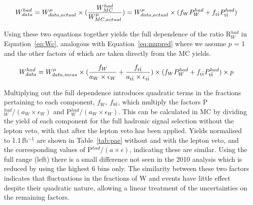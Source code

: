 \begin{equation}
W^{had}_{data} = W^{\mu}_{data, actual } \times (\frac{W^{had}_{MC}}{W^{\mu}_{MC, actual}}) = W^{\mu}_{data, actual } \times (f_{W} P^{had}_{W} + f_{\textrm{t}\bar{\textrm{t}}} P^{had}_{\textrm{t}\bar{\textrm{t}}})
\label{eq:Wb}
\end{equation}

Using these two equations together yields the full dependence of the ratio R$^{had}_{W}$ in Equation~\ref{eq:Wc}, analogous with Equation~\ref{eq:mupred} where we assume $p$ = 1 and the other factors of which are taken directly from the MC yields.

\begin{equation}
W^{had}_{data} = W^{\mu}_{data, meas} \times (\frac{f_{W}}{a_{W} \times \epsilon_{W}} + \frac{f_{\textrm{t}\bar{\textrm{t}}}}{a_{\textrm{t}\bar{\textrm{t}}} \times \epsilon_{\textrm{t}\bar{\textrm{t}}}}) \times (f_{W} P^{had}_{W} + f_{\textrm{t}\bar{\textrm{t}}} P^{had}_{\textrm{t}\bar{\textrm{t}}}) \times p
\label{eq:Wc}
\end{equation}

 Multiplying out the full dependence introduces quadratic terms in the fractions pertaining to each component, $f_{W}$, $f_{\textrm{t}\bar{\textrm{t}}}$, which multiply the factors P$^{had}_{W}/(a_{W} \times \epsilon_{W})$ and P$^{had}_{W}/(a_{W} \times \epsilon_{W})$. This can be calculated in MC by dividing the yield of each component for the full hadronic signal selection without the lepton veto, with that after the lepton veto has been applied. Yields normalised to 1.1\,fb$^{-1}$ are shown in Table~\ref{tab:pae} without and with the lepton veto, and the corresponding values of P$^{had}/(a \times \epsilon)$, indicating these are similar. Using the full \HT range (left) there is a small difference not seen in the 2010 analysis which is reduced by using the highest 6 bins only. The similarity between these two factors indicates that fluctuations in the fractions of W and \tto events have little effect despite their quadratic nature, allowing a linear treatment of the uncertainties on the remaining factors. 
 
